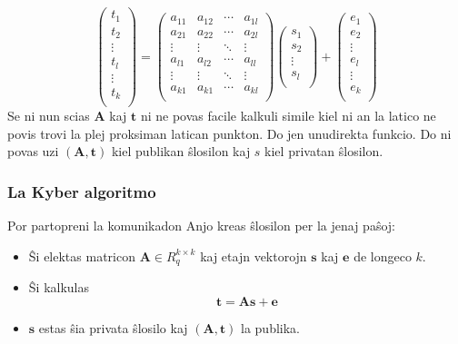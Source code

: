 \documentclass[utf8]{scrartcl}
\begin{document}
\begin{equation}
  \label{eq:leranado-kun-eraro}
  \begin{pmatrix}
    t_1 \\ t_2 \\ \vdots \\ t_l \\ \vdots \\ t_k \\
  \end{pmatrix}
  =
  \begin{pmatrix}
    a_{11} & a_{12} & \cdots & a_{1l} \\
    a_{21} & a_{22} & \cdots & a_{2l} \\
    \vdots & \vdots & \ddots & \vdots \\
    a_{l1} & a_{l2} & \cdots & a_{ll} \\
    \vdots & \vdots & \ddots & \vdots \\
    a_{k1} & a_{k1} & \cdots & a_{kl} \\
  \end{pmatrix}
  \begin{pmatrix}
    s_1 \\ s_2 \\ \vdots \\ s_l \\
  \end{pmatrix}
  +
  \begin{pmatrix}
    e_1 \\ e_2 \\ \vdots \\ e_l \\ \vdots \\ e_k \\
  \end{pmatrix}
\end{equation}
Se ni nun scias $\mathbf{A}$ kaj $\mathbf{t}$ ni ne povas facile kalkuli simile
kiel ni an la latico ne povis trovi la plej proksiman latican punkton. Do jen
unudirekta funkcio. Do ni povas uzi $(\mathbf{A}, \mathbf{t})$ kiel publikan
ŝlosilon kaj $s$ kiel privatan ŝlosilon.

\subsubsection{La Kyber algoritmo}

Por partopreni la komunikadon Anjo kreas ŝlosilon per la jenaj paŝoj:
\begin{itemize}
\item Ŝi elektas matricon $\mathbf{A} \in R_q^{k\times k}$ kaj etajn vektorojn
  $\mathbf{s}$ kaj $\mathbf{e}$ de longeco $k$.
\item Ŝi kalkulas
  \begin{equation}
    \label{eq:kalkulo-t}
    \mathbf{t} = \mathbf{A}\mathbf{s} + \mathbf{e}
  \end{equation}
\item $\mathbf{s}$ estas ŝia privata ŝlosilo kaj $(\mathbf{A}, \mathbf{t})$ la
  publika.
\end{itemize}
\end{document}
